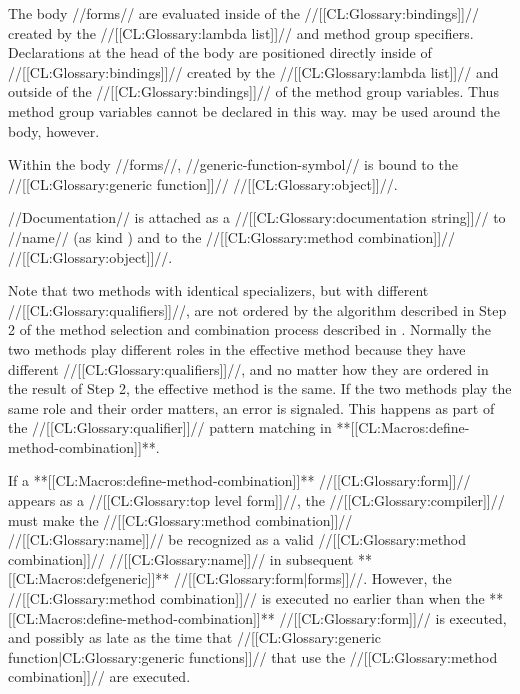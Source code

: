 The body //forms// are evaluated inside of the //[[CL:Glossary:bindings]]// created by the //[[CL:Glossary:lambda list]]// and method group specifiers.  Declarations at the head of the body are positioned directly inside of //[[CL:Glossary:bindings]]// created by the //[[CL:Glossary:lambda list]]// and outside of the //[[CL:Glossary:bindings]]// of the method group variables. Thus method group variables cannot be declared in this way.  may be used around the body, however.

Within the body //forms//, //generic-function-symbol// is bound to the //[[CL:Glossary:generic function]]// //[[CL:Glossary:object]]//.

//Documentation// is attached as a //[[CL:Glossary:documentation string]]// to //name// (as kind ) and to the //[[CL:Glossary:method combination]]// //[[CL:Glossary:object]]//.

Note that two methods with identical specializers, but with different //[[CL:Glossary:qualifiers]]//, are not ordered by the algorithm described in Step 2 of the method selection and combination process described in \secref\MethodSelectionAndCombination. Normally the two methods play different roles in the effective method because they have different //[[CL:Glossary:qualifiers]]//, and no matter how they are ordered in the result of Step 2, the effective method is the same. If the two methods play the same role and their order matters,  an error is signaled. This happens as part of the //[[CL:Glossary:qualifier]]// pattern matching in **[[CL:Macros:define-method-combination]]**.

\endlist

If a **[[CL:Macros:define-method-combination]]** //[[CL:Glossary:form]]// appears as a //[[CL:Glossary:top level form]]//, the //[[CL:Glossary:compiler]]// must make the //[[CL:Glossary:method combination]]// //[[CL:Glossary:name]]// be recognized as a valid //[[CL:Glossary:method combination]]// //[[CL:Glossary:name]]// in subsequent **[[CL:Macros:defgeneric]]** //[[CL:Glossary:form|forms]]//. However, the //[[CL:Glossary:method combination]]// is executed no earlier than when the **[[CL:Macros:define-method-combination]]** //[[CL:Glossary:form]]// is executed, and possibly as late as the time that //[[CL:Glossary:generic function|CL:Glossary:generic functions]]// that use the //[[CL:Glossary:method combination]]// are executed.

